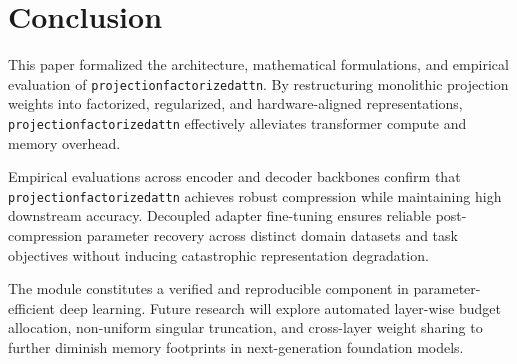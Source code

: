 \section{Conclusion}
This paper formalized the architecture, mathematical formulations, and empirical evaluation of \texttt{projectionfactorizedattn}. By restructuring monolithic projection weights into factorized, regularized, and hardware-aligned representations, \texttt{projectionfactorizedattn} effectively alleviates transformer compute and memory overhead.

Empirical evaluations across encoder and decoder backbones confirm that \texttt{projectionfactorizedattn} achieves robust compression while maintaining high downstream accuracy. Decoupled adapter fine-tuning ensures reliable post-compression parameter recovery across distinct domain datasets and task objectives without inducing catastrophic representation degradation.

The module constitutes a verified and reproducible component in parameter-efficient deep learning. Future research will explore automated layer-wise budget allocation, non-uniform singular truncation, and cross-layer weight sharing to further diminish memory footprints in next-generation foundation models.
